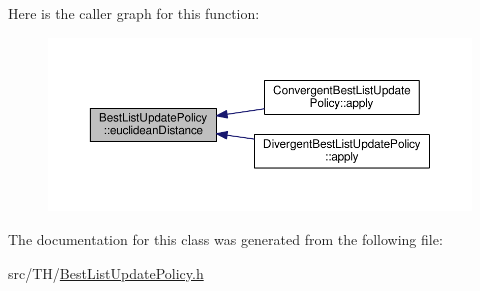 Here is the caller graph for this function\+:\nopagebreak
\begin{figure}[H]
\begin{center}
\leavevmode
\includegraphics[width=350pt]{classBestListUpdatePolicy_a6987f90d6d9e5fec813f5aa53fe47ce3_icgraph}
\end{center}
\end{figure}




The documentation for this class was generated from the following file\+:\begin{DoxyCompactItemize}
\item 
src/\+T\+H/\hyperlink{BestListUpdatePolicy_8h}{Best\+List\+Update\+Policy.\+h}\end{DoxyCompactItemize}
